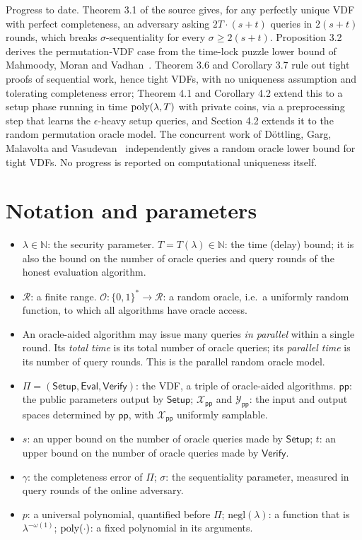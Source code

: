 \documentclass{aicr-conjecture}
\newcommand{\RO}{\mathcal{O}}
\newcommand{\Setup}{\mathsf{Setup}}
\newcommand{\Eval}{\mathsf{Eval}}
\newcommand{\Verify}{\mathsf{Verify}}
\newcommand{\pp}{\mathsf{pp}}
\newcommand{\Xpp}{\mathcal{X}_{\pp}}
\newcommand{\Ypp}{\mathcal{Y}_{\pp}}
\newcommand{\negl}{\mathrm{negl}}
\begin{document}
Progress to date. Theorem 3.1 of the source gives, for any perfectly unique
VDF with perfect completeness, an adversary asking $2T\cdot(s+t)$ queries
in $2(s+t)$ rounds, which breaks $\sigma$-sequentiality for every
$\sigma \ge 2(s+t)$. Proposition 3.2 derives the permutation-VDF case from
the time-lock puzzle lower bound of Mahmoody, Moran and
Vadhan~\cite{MMV11}. Theorem 3.6 and Corollary 3.7 rule out tight proofs of
sequential work, hence tight VDFs, with no uniqueness assumption and
tolerating completeness error; Theorem 4.1 and Corollary 4.2 extend this to
a setup phase running in time $\mathrm{poly}(\lambda, T)$ with private coins, via a
preprocessing step that learns the $\epsilon$-heavy setup queries, and
Section 4.2 extends it to the random permutation oracle model. The
concurrent work of D\"ottling, Garg, Malavolta and
Vasudevan~\cite{DGMV19} independently gives a random oracle lower bound for
tight VDFs. No progress is reported on computational uniqueness itself.

\section{Notation and parameters}\label{sec:notation}

\begin{itemize}
  \item $\lambda \in \mathbb{N}$: the security parameter.
    $T = T(\lambda) \in \mathbb{N}$: the time (delay) bound; it is also
    the bound on the number of oracle queries and query rounds of the
    honest evaluation algorithm.
  \item $\mathcal{R}$: a finite range.
    $\RO \colon \{0,1\}^{*} \to \mathcal{R}$: a random oracle, i.e.\ a
    uniformly random function, to which all algorithms have oracle access.
  \item An oracle-aided algorithm may issue many queries \emph{in
    parallel} within a single round. Its \emph{total time} is its total
    number of oracle queries; its \emph{parallel time} is its number of
    query rounds. This is the parallel random oracle model.
  \item $\Pi = (\Setup, \Eval, \Verify)$: the VDF, a triple of oracle-aided
    algorithms. $\pp$: the public parameters output by $\Setup$; $\Xpp$
    and $\Ypp$: the input and output spaces determined by $\pp$, with
    $\Xpp$ uniformly samplable.
  \item $s$: an upper bound on the number of oracle queries made by
    $\Setup$; $t$: an upper bound on the number of oracle queries made by
    $\Verify$.
  \item $\gamma$: the completeness error of $\Pi$; $\sigma$: the
    sequentiality parameter, measured in query rounds of the online
    adversary.
  \item $p$: a universal polynomial, quantified before $\Pi$;
    $\negl(\lambda)$: a function that is $\lambda^{-\omega(1)}$;
    $\mathrm{poly}(\cdot)$: a fixed polynomial in its arguments.
\end{itemize}
\end{document}
